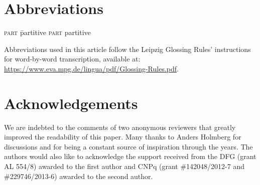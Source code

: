 \documentclass[output=paper]{LSP/langsci}
\begin{document}
\section*{Abbreviations}
\begin{tabbing}
\textsc{part} \= partitive \kill
\textsc{part} \> partitive
\end{tabbing}
Abbreviations used in this article follow the Leipzig Glossing Rules’ instructions for word-by-word transcription, available at: \url{https://www.eva.mpg.de/lingua/pdf/Glossing-Rules.pdf}.

\section*{Acknowledgements}
We are indebted to the comments of two anonymous reviewers that greatly improved the readability of this paper. Many thanks to Anders Holmberg for discussions and for being a constant source of inspiration through the years. The authors would also like to acknowledge the support received from the DFG (grant AL 554\slash 8) awarded to the first author and CNPq (grant \#142048\slash 2012-7 and \#229746\slash 2013-6) awarded to the second author.

{\sloppy
\printbibliography[heading=subbibliography,notkeyword=this]
}
\end{document}
